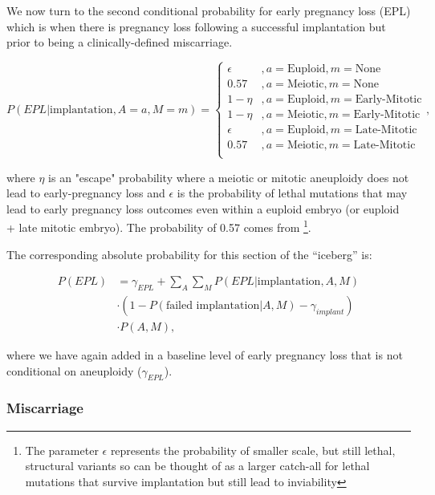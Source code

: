 \documentclass{article}
\begin{document}
We now turn to the second conditional probability for early pregnancy loss (EPL) which is when there is pregnancy loss following a successful implantation but prior to being a clinically-defined miscarriage.

\begin{equation}
	P(EPL | \text{implantation}, A=a, M=m) = \begin{cases}
	\epsilon &, a= \text{Euploid}, m=\text{None}\\
	0.57 &, a = \text{Meiotic}, m=\text{None}\\
	1 - \eta &, a = \text{Euploid}, m=\text{Early-Mitotic}\\
	1 - \eta &, a = \text{Meiotic}, m=\text{Early-Mitotic}\\
	\epsilon &, a = \text{Euploid}, m=\text{Late-Mitotic}\\
	0.57 &, a = \text{Meiotic}, m=\text{Late-Mitotic}\\
	\end{cases},
\end{equation}

where $\eta$ is an "escape" probability where a meiotic or mitotic aneuploidy does not lead to early-pregnancy loss and $\epsilon$ is the probability of lethal mutations that may lead to early pregnancy loss outcomes even within a euploid embryo (or euploid + late mitotic embryo). The probability of 0.57 comes from \citep{Gu2021-tk}\footnote{The parameter $\epsilon$ represents the probability of smaller scale, but still lethal, structural variants so can be thought of as a larger catch-all for lethal mutations that survive implantation but still lead to inviability}. 

The corresponding absolute probability for this section of the ``iceberg'' is: 

\begin{equation}
\begin{aligned}
P(EPL) &=  \gamma_{EPL} + \sum_{A}\sum_{M} P(EPL | \text{implantation}, A, M) \\
&\cdot (1 - P(\text{failed implantation} | A, M) - \gamma_{implant})\\ 
&\cdot P(A, M),
\end{aligned}
\end{equation}

where we have again added in a baseline level of early pregnancy loss that is not conditional on aneuploidy ($\gamma_{EPL}$). 

\subsubsection*{Miscarriage}
\end{document}
